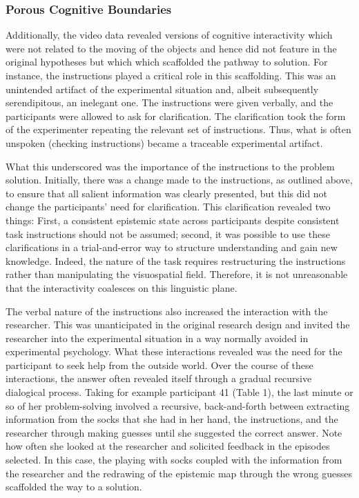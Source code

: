 \hypertarget{porous-cognitive-boundaries}{%
\subsubsection{Porous Cognitive
Boundaries}\label{porous-cognitive-boundaries}}

Additionally, the video data revealed versions of cognitive
interactivity which were not related to the moving of the objects and
hence did not feature in the original hypotheses but which which
scaffolded the pathway to solution. For instance, the instructions
played a critical role in this scaffolding. This was an unintended
artifact of the experimental situation and, albeit subsequently
serendipitous, an inelegant one. The instructions were given verbally,
and the participants were allowed to ask for clarification. The
clarification took the form of the experimenter repeating the relevant
set of instructions. Thus, what is often unspoken (checking
instructions) became a traceable experimental artifact.

What this underscored was the importance of the instructions to the
problem solution. Initially, there was a change made to the
instructions, as outlined above, to ensure that all salient information
was clearly presented, but this did not change the participants' need
for clarification. This clarification revealed two things: First, a
consistent epistemic state across participants despite consistent task
instructions should not be assumed; second, it was possible to use these
clarifications in a trial-and-error way to structure understanding and
gain new knowledge. Indeed, the nature of the task requires
restructuring the instructions rather than manipulating the visuospatial
field. Therefore, it is not unreasonable that the interactivity
coalesces on this linguistic plane.

The verbal nature of the instructions also increased the interaction
with the researcher. This was unanticipated in the original research
design and invited the researcher into the experimental situation in a
way normally avoided in experimental psychology. What these interactions
revealed was the need for the participant to seek help from the outside
world. Over the course of these interactions, the answer often revealed
itself through a gradual recursive dialogical process. Taking for
example participant 41 (Table 1), the last minute or so of her
problem-solving involved a recursive, back-and-forth between extracting
information from the socks that she had in her hand, the instructions,
and the researcher through making guesses until she suggested the
correct answer. Note how often she looked at the researcher and
solicited feedback in the episodes selected. In this case, the playing
with socks coupled with the information from the researcher and the
redrawing of the epistemic map through the wrong guesses scaffolded the
way to a solution.


